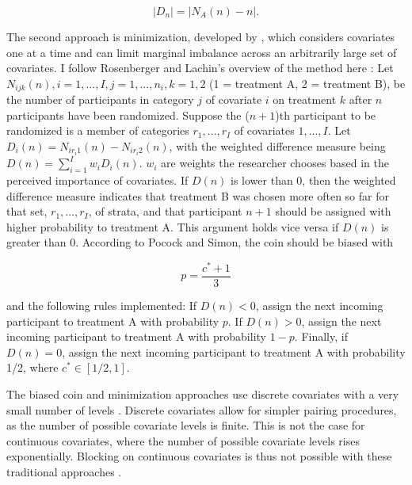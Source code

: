 \documentclass[12pt,]{article}
\begin{document}
\singlespacing

\vspace{-0.5cm}

\[\lvert D_n \rvert = \lvert N_A(n) - n \rvert.\]

\doublespacing

The second approach is minimization, developed by
\citet{pocock_1975_sequential}, which considers covariates one at a time
and can limit marginal imbalance across an arbitrarily large set of
covariates. I follow Rosenberger and Lachin's overview of the method
here \citep{rosenberger_2002_randomization}: Let
\(N_{ijk}(n), i = 1, ..., I, j = 1, ..., n_i, k = 1,2\) (1 = treatment
A, 2 = treatment B), be the number of participants in category \(j\) of
covariate \(i\) on treatment \(k\) after \(n\) participants have been
randomized. Suppose the (\(n + 1\))th participant to be randomized is a
member of categories \(r_1, ..., r_I\) of covariates \(1, ..., I\). Let
\(D_i(n) = N_{ir_{i}1}(n) - N_{ir_{i}2}(n)\), with the weighted
difference measure being \(D(n) = \sum\limits_{i=1}^I w_iD_i(n)\).
\(w_i\) are weights the researcher chooses based in the perceived
importance of covariates. If \(D(n)\) is lower than 0, then the weighted
difference measure indicates that treatment B was chosen more often so
far for that set, \(r_1, ..., r_I\), of strata, and that participant
\(n + 1\) should be assigned with higher probability to treatment A.
This argument holds vice versa if \(D(n)\) is greater than 0. According
to Pocock and Simon, the coin should be biased with

\singlespacing

\vspace{-0.5cm}

\[p = \frac{c^* + 1}{3} \]

\doublespacing

and the following rules implemented: If \(D(n) < 0\), assign the next
incoming participant to treatment A with probability \(p\). If
\(D(n) > 0\), assign the next incoming participant to treatment A with
probability \(1-p\). Finally, if \(D(n) = 0\), assign the next incoming
participant to treatment A with probability 1/2, where
\(c^* \in [1/2,1]\).

The biased coin and minimization approaches use discrete covariates with
a very small number of levels \citep{moore_blocking_2013}. Discrete
covariates allow for simpler pairing procedures, as the number of
possible covariate levels is finite. This is not the case for continuous
covariates, where the number of possible covariate levels rises
exponentially. Blocking on continuous covariates is thus not possible
with these traditional approaches
\citep{markaryan_2010_exact, rosenberger_2002_randomization, eisele_1995_biased}.
\end{document}
